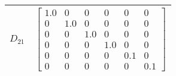 \begin{tabular}{cl}
 $D_{21}$ & $\left[\begin{matrix}1.0 & 0 & 0 & 0 & 0 & 0\\0 & 1.0 & 0 & 0 & 0 & 0\\0 & 0 & 1.0 & 0 & 0 & 0\\0 & 0 & 0 & 1.0 & 0 & 0\\0 & 0 & 0 & 0 & 0.1 & 0\\0 & 0 & 0 & 0 & 0 & 0.1\end{matrix}\right]$                                                                                                                                                                                                                                                                                                                                                                                                                                                                                                                                                                                                                                                                                                                                                                                                                                                                                                                                                                                                                                                                                                                                                                                                                                                                                                                                                                                                                                                                                                                                                                                                                                                                                                                                                                                                                                                                                                                                                                                                                                                                                    \\
\hline
\end{tabular}